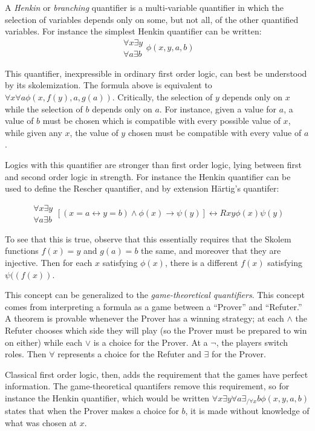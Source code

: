 \documentclass[12pt]{article}
\begin{document}
A \emph{Henkin} or \emph{branching} quantifier is a multi-variable quantifier in which the selection of variables depends only on some, but not all, of the other quantified variables.  For instance the simplest Henkin quantifier can be written:
$$\begin{array}{c}\forall x\exists y\\\forall a\exists b\end{array}\phi(x,y,a,b)$$

This quantifier, inexpressible in ordinary first order logic, can best be understood by its skolemization.  The formula above is equivalent to $\forall x\forall a\phi(x,f(y),a,g(a))$.  Critically, the selection of $y$ depends only on $x$ while the selection of $b$ depends only on $a$.  For instance, given a value for $a$, a value of $b$ must be chosen which is compatible with every possible value of $x$, while given any $x$, the value of $y$ chosen must be compatible with every value of $a$.

Logics with this quantifier are stronger than first order logic, lying between first and second order logic in strength.  For instance the Henkin quantifier can be used to define the Rescher quantifier, and by extension H\"artig's quantifer:

$$\begin{array}{c}
\forall x\exists y\\
\forall a\exists b
\end{array}
[(x=a\leftrightarrow y=b)\wedge\phi(x)\rightarrow\psi(y)]\leftrightarrow Rxy\phi(x)\psi(y)$$

To see that this is true, observe that this essentially requires that the Skolem functions $f(x)=y$ and $g(a)=b$ the same, and moreover that they are injective.  Then for each $x$ satisfying $\phi(x)$, there is a different $f(x)$ satisfying $\psi((f(x))$.

This concept can be generalized to the \emph{game-theoretical quantifiers}.  This concept comes from interpreting a formula as a game between a ``Prover'' and ``Refuter.''  A theorem is provable whenever the Prover has a winning strategy; at each $\wedge$ the Refuter chooses which side they will play (so the Prover must be prepared to win on either) while each $\vee$ is a choice for the Prover.  At a $\neg$, the players switch roles.  Then $\forall$ represents a choice for the Refuter and $\exists$ for the Prover.

Classical first order logic, then, adds the requirement that the games have perfect information.  The game-theoretical quantifers remove this requirement, so for instance the Henkin quantifier, which would be written $\forall x\exists y\forall a\exists_{/\forall x} b\phi(x,y,a,b)$ states that when the Prover makes a choice for $b$, it is made without knowledge of what was chosen at $x$.
\end{document}
